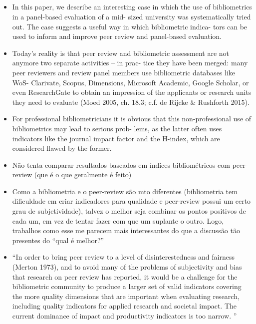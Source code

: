 \documentclass[11pt]{article}
\begin{document}
\subsection{\cite{besselaar2020}}
\label{sec:orgee11268}
\begin{itemize}
\item In this paper, we describe an interesting case in which the use of bibliometrics in a panel-based evaluation of a mid- sized university was systematically tried out. The case suggests a useful way in which bibliometric indica- tors can be used to inform and improve peer review and panel-based evaluation.
\item Today’s reality is that peer review and bibliometric assessment are not anymore two separate activities – in prac- tice they have been merged: many peer reviewers and review panel members use bibliometric databases like WoS- Clarivate, Scopus, Dimensions, Microsoft Academic, Google Scholar, or even ResearchGate to obtain an impression of the applicants or research units they need to evaluate (Moed 2005, ch. 18.3; c.f. de Rijcke \& Rushforth 2015).
\item For professional bibliometricians it is obvious that this non-professional use of bibliometrics may lead to serious prob- lems, as the latter often uses indicators like the journal impact factor and the H-index, which are considered flawed by  the former.
\item Não tenta comparar resultados baseados em  índices bibliométricos com peer-review (que é o que geralmente é feito)
\item Como a bibliometria e o peer-review são mto diferentes (bibliometria tem dificuldade em criar indicadores para qualidade e peer-review possui um certo grau de subjetividade), talvez o melhor seja combinar os pontos positivos de cada um, em vez de tentar fazer com que um suplante o outro. Logo, trabalhos como esse me parecem mais interessantes do que a discussão tão presentes do ``qual é melhor?''
\item ``In order to bring peer review to a level of disinterestedness and fairness (Merton 1973), and to avoid many of the problems of subjectivity and bias that research on peer review has reported, it would be a challenge for the bibliometric community to produce a larger set of valid indicators covering the more quality dimensions that are important when evaluating research, including quality indicators for applied research and societal impact. The current dominance of impact and productivity indicators is too narrow. ''
\end{itemize}
\end{document}
